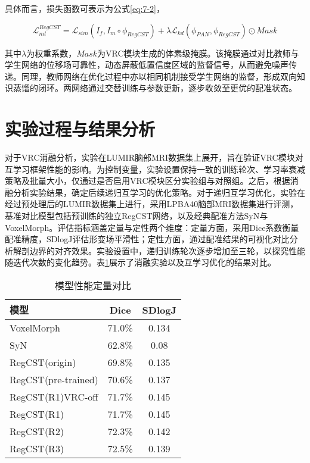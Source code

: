 具体而言，损失函数可表示为公式\ref{eq:7-2}，

\begin{equation}
    \mathcal{L}_{ml}^{RegCST}=\mathcal{L}_{sim}(I_f,I_m\circ \phi_{RegCST})+\lambda\mathcal{L}_{kd}(\phi_{PAN},\phi_{RegCST})\odot Mask
    \label{eq:7-2}
\end{equation}

其中$\lambda$为权重系数，$Mask$为VRC模块生成的体素级掩膜。该掩膜通过对比教师与学生网络的位移场可靠性，动态屏蔽低置信度区域的监督信号，从而避免噪声传递。同理，教师网络在优化过程中亦以相同机制接受学生网络的监督，形成双向知识蒸馏的闭环。两网络通过交替训练与参数更新，逐步收敛至更优的配准状态。


\section{实验过程与结果分析}

对于VRC消融分析，实验在LUMIR脑部MRI数据集上展开，旨在验证VRC模块对互学习框架性能的影响。为控制变量，实验设置保持一致的训练轮次、学习率衰减策略及批量大小，仅通过是否启用VRC模块区分实验组与对照组。之后，根据消融分析实验结果，确定后续递归互学习的优化策略。对于递归互学习优化，实验在经过预处理后的LUMIR数据集上进行，采用LPBA40脑部MRI数据集进行评测，基准对比模型包括预训练的独立RegCST网络，以及经典配准方法SyN与VoxelMorph。评估指标涵盖定量与定性两个维度：定量方面，采用Dice系数衡量配准精度，SDlogJ评估形变场平滑性；定性方面，通过配准结果的可视化对比分析解剖边界的对齐效果。实验设置中，递归训练轮次逐步增加至三轮，以探究性能随迭代次数的变化趋势。表\ref{tab:7-1}展示了消融实验以及互学习优化的结果对比。

\begin{table}[h]
    \centering
    \caption{模型性能定量对比}
    \label{tab:7-1}
    \begin{tabular}{lcc}
        \toprule
        \textbf{模型}         & \textbf{Dice} & \textbf{SDlogJ} \\
        \midrule
        VoxelMorph          & 71.0\%        & 0.134           \\
        SyN                 & 62.8\%        & 0.08            \\
        RegCST(origin)      & 69.8\%        & 0.135           \\
        RegCST(pre-trained) & 70.6\%        & 0.137           \\
        RegCST(R1)VRC-off          & 71.7\%        & 0.145           \\
        RegCST(R1)         & 71.7\%        & 0.145           \\
        RegCST(R2)          & 72.3\%        & 0.142           \\
        RegCST(R3)          & 72.5\%        & 0.139           \\
        \bottomrule
    \end{tabular}
\end{table}

